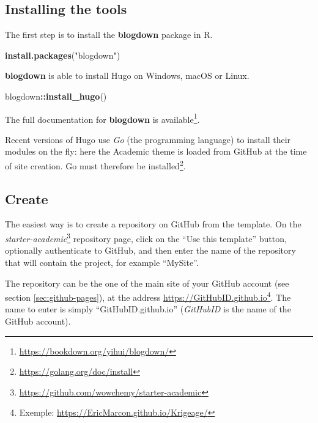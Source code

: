 \documentclass[
  12pt,
  american,
  a4paper,
  extrafontsizes,onecolumn,openright
  ]{memoir}
\newenvironment{Shaded}{\begin{snugshade}}{\end{snugshade}}
\newcommand{\FunctionTok}[1]{\textcolor[rgb]{0.13,0.29,0.53}{\textbf{#1}}}
\newcommand{\NormalTok}[1]{#1}
\newcommand{\SpecialCharTok}[1]{\textcolor[rgb]{0.81,0.36,0.00}{\textbf{#1}}}
\newcommand{\StringTok}[1]{\textcolor[rgb]{0.31,0.60,0.02}{#1}}
\begin{document}
\subsection{Installing the tools}\label{installing-the-tools}

The first step is to install the \textbf{blogdown} package in R.

\scriptsize

\begin{Shaded}
\begin{Highlighting}[]
\FunctionTok{install.packages}\NormalTok{(}\StringTok{"blogdown"}\NormalTok{)}
\end{Highlighting}
\end{Shaded}

\normalsize

\textbf{blogdown} is able to install Hugo on Windows, macOS or Linux.

\scriptsize

\begin{Shaded}
\begin{Highlighting}[]
\NormalTok{blogdown}\SpecialCharTok{::}\FunctionTok{install\_hugo}\NormalTok{()}
\end{Highlighting}
\end{Shaded}

\normalsize

The full documentation for \textbf{blogdown} is available\footnote{\url{https://bookdown.org/yihui/blogdown/}}.

Recent versions of Hugo use \emph{Go} (the programming language) to install their modules on the fly: here the Academic theme is loaded from GitHub at the time of site creation.
Go must therefore be installed\footnote{\url{https://golang.org/doc/install}}.

\subsection{Create}\label{create-2}

The easiest way is to create a repository on GitHub from the template.
On the \emph{starter-academic}\footnote{\url{https://github.com/wowchemy/starter-academic}} repository page, click on the \enquote{Use this template} button, optionally authenticate to GitHub, and then enter the name of the repository that will contain the project, for example \enquote{MySite}.

The repository can be the one of the main site of your GitHub account (see section \ref{sec:github-pages}), at the address \url{https://GitHubID.github.io}\footnote{Exemple: \url{https://EricMarcon.github.io/Krigeage/}}.
The name to enter is simply \enquote{GitHubID.github.io} (\emph{GitHubID} is the name of the GitHub account).
\end{document}
